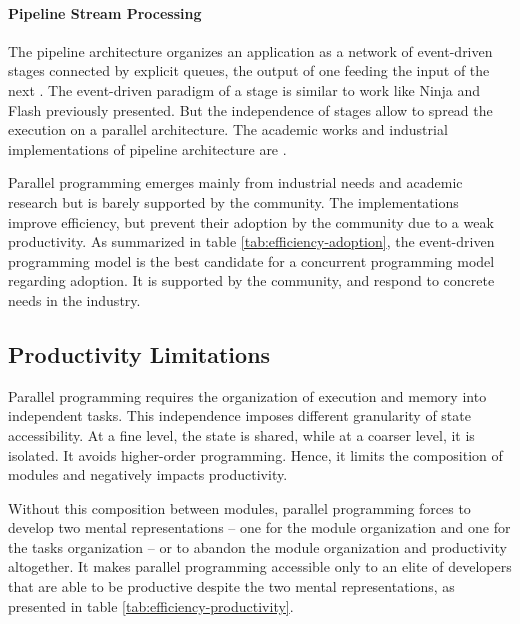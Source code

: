 \paragraph{Pipeline Stream Processing}

The pipeline architecture organizes an application as a network of event-driven stages connected by explicit queues, the output of one feeding the input of the next \cite{Welsh2001}.
The event-driven paradigm of a stage is similar to work like Ninja \cite{Gribble2001} and Flash \cite{Pai1999} previously presented.
But the independence of stages allow to spread the execution on a parallel architecture.
The academic works and industrial implementations of pipeline architecture are .

\separator

Parallel programming emerges mainly from industrial needs and academic research but is barely supported by the community.
The implementations improve efficiency, but prevent their adoption by the community due to a weak productivity.
As summarized in table \ref{tab:efficiency-adoption}, the event-driven programming model is the best candidate for a concurrent programming model regarding adoption.
It is supported by the community, and respond to concrete needs in the industry.


\subsection{Productivity Limitations} \label{chapter3:software-efficiency:productivity-limitations}

Parallel programming requires the organization of execution and memory into independent tasks.
This independence imposes different granularity of state accessibility.
At a fine level, the state is shared, while at a coarser level, it is isolated.
It avoids higher-order programming.
Hence, it limits the composition of modules and negatively impacts productivity.

Without this composition between modules, parallel programming forces to develop two mental representations -- one for the module organization and one for the tasks organization -- or to abandon the module organization and productivity altogether.
It makes parallel programming accessible only to an elite of developers that are able to be productive despite the two mental representations, as presented in table \ref{tab:efficiency-productivity}.

